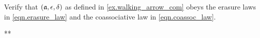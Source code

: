 \documentclass[Book-Poly]{subfiles}
\begin{document}
\begin{exercise} \label{exc.walking_arrow_com}
Verify that $(\mathfrak{a},\epsilon,\delta)$ as defined in \cref{ex.walking_arrow_com} obeys the erasure laws in \eqref{eqn.erasure_law} and the coassociative law in \eqref{eqn.coassoc_law}.
\begin{solution}
** %

\end{solution}
\end{exercise}
\end{document}

